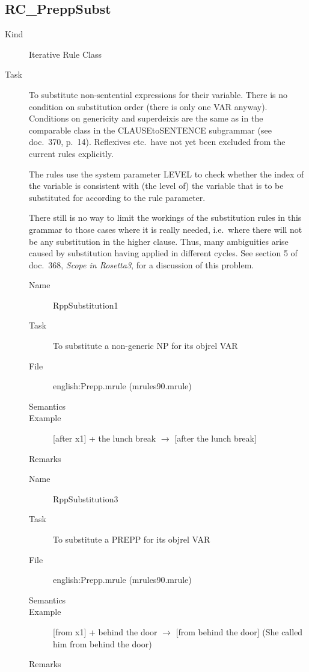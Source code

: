\subsection{RC\_PreppSubst}
\begin{description}
\item[Kind] Iterative Rule Class
\item[Task] To substitute non-sentential expressions for their variable. There 
is no condition on substitution order (there is only one VAR anyway).
Conditions on genericity and superdeixis are the same as in the comparable 
class in the CLAUSEtoSENTENCE subgrammar (see doc.\ 370, p.\ 14). Reflexives 
etc.\ have not yet been excluded from the current rules explicitly. 

The rules use the system parameter LEVEL to check whether the index of the 
variable is consistent with (the level of) the variable that is to be 
substituted for according to the rule parameter.

There still is no way to limit the workings of the substitution rules in this 
grammar to those cases where it is really needed, i.e.\ where there will not be 
any substitution in the higher clause. Thus, many ambiguities arise caused by
substitution having applied in different cycles. See section 5 of doc.\ 368, {
\em Scope in Rosetta3\/}, for a discussion of this problem.

\vspace{1 cm}
\begin{description}
\item[Name] RppSubstitution1
\item[Task] To substitute a non-generic NP for its objrel VAR
\item[File] english:Prepp.mrule (mrules90.mrule)
\item[Semantics]
\item[Example] [after x1] + the lunch break $\rightarrow$ [after the lunch 
break]
\item[Remarks]
\end{description}

\vspace{1 cm}
\begin{description}
\item[Name] RppSubstitution3
\item[Task] To substitute a PREPP for its objrel VAR
\item[File] english:Prepp.mrule (mrules90.mrule)
\item[Semantics]
\item[Example] [from x1] + behind the door $\rightarrow$ [from behind 
the door] (She called him from behind the door)
\item[Remarks] 
\end{description}


\end{description}
